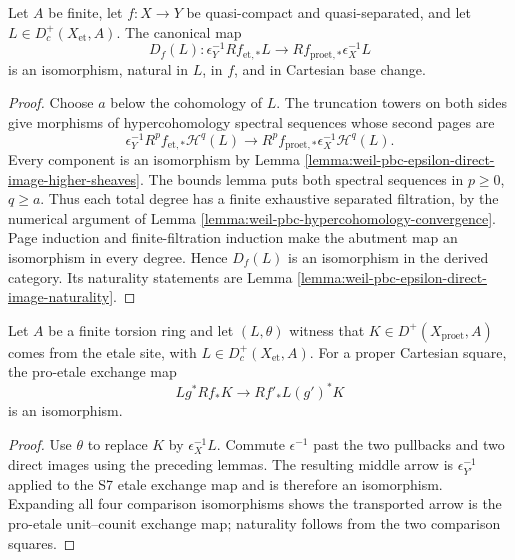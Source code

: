 \begin{lemma}
\label{lemma:weil-pbc-epsilon-direct-image}
Let $A$ be finite, let $f:X\to Y$ be quasi-compact and quasi-separated, and
let $L\in D_c^+(X_{\mathrm{et}},A)$.  The canonical map
\[
 D_f(L):\epsilon_Y^{-1}Rf_{\mathrm{et},*}L
 \longrightarrow Rf_{\mathrm{proet},*}\epsilon_X^{-1}L
\]
is an isomorphism, natural in $L$, in $f$, and in Cartesian base change.
\end{lemma}
\begin{proof}

Choose $a$ below the cohomology of $L$.  The truncation towers on both sides
give morphisms of hypercohomology spectral sequences whose second pages are
\[
 \epsilon_Y^{-1}R^pf_{\mathrm{et},*}\mathcal H^q(L)
 \longrightarrow
 R^pf_{\mathrm{proet},*}\epsilon_X^{-1}\mathcal H^q(L).
\]
Every component is an isomorphism by Lemma
\ref{lemma:weil-pbc-epsilon-direct-image-higher-sheaves}.  The bounds lemma
puts both spectral sequences in $p\geq0$, $q\geq a$.  Thus each total degree
has a finite exhaustive separated filtration, by the numerical argument of
Lemma \ref{lemma:weil-pbc-hypercohomology-convergence}.  Page induction and
finite-filtration induction make the abutment map an isomorphism in every
degree.  Hence $D_f(L)$ is an isomorphism in the derived category.  Its
naturality statements are Lemma
\ref{lemma:weil-pbc-epsilon-direct-image-naturality}.
\end{proof}

\begin{proposition}
\label{prop:weil-pbc-proet-finite-level-transport}
Let $A$ be a finite torsion ring and let $(L,\theta)$ witness that
$K\in D^+(X_{\mathrm{proet}},A)$ comes from the etale site, with
$L\in D_c^+(X_{\mathrm{et}},A)$.  For a proper Cartesian square, the
pro-etale exchange map
\[
 Lg^*Rf_*K\longrightarrow Rf'_*L(g')^*K
\]
is an isomorphism.
\end{proposition}
\begin{proof}

Use $\theta$ to replace $K$ by $\epsilon_X^{-1}L$.  Commute
$\epsilon^{-1}$ past the two pullbacks and two direct images using the
preceding lemmas.  The resulting middle arrow is
$\epsilon_{Y'}^{-1}$ applied to the S7 etale exchange map and is therefore an
isomorphism.  Expanding all four comparison isomorphisms shows the transported
arrow is the pro-etale unit--counit exchange map; naturality follows from the
two comparison squares.
\end{proof}

